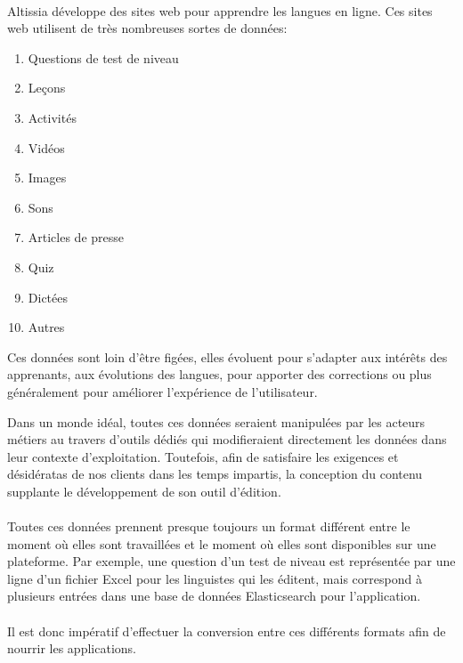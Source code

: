 \paragraph{}
Altissia développe des sites web pour apprendre les langues en ligne.
Ces sites web utilisent de très nombreuses sortes de données:
\begin{enumerate}
    \item Questions de test de niveau
    \item Leçons
    \item Activités
    \item Vidéos
    \item Images
    \item Sons
    \item Articles de presse
    \item Quiz
    \item Dictées
    \item Autres
\end{enumerate}
Ces données sont loin d'être figées, elles évoluent pour s'adapter aux intérêts des apprenants, aux évolutions des langues, pour apporter des corrections ou plus généralement pour améliorer l'expérience de l'utilisateur.

Dans un monde idéal, toutes ces données seraient manipulées par les acteurs métiers au travers d'outils dédiés qui modifieraient directement les données dans leur contexte d'exploitation.
Toutefois, afin de satisfaire les exigences et désidératas de nos clients dans les temps impartis, la conception du contenu supplante le développement de son outil d'édition.

\paragraph{}
Toutes ces données prennent presque toujours un format différent entre le moment où elles sont travaillées et le moment où elles sont disponibles sur une plateforme.
Par exemple, une question d'un test de niveau est représentée par une ligne d'un fichier Excel pour les linguistes qui les éditent, mais correspond à plusieurs entrées dans une base de données Elasticsearch pour l'application.

\paragraph{}
Il est donc impératif d'effectuer la conversion entre ces différents formats afin de nourrir les applications.
